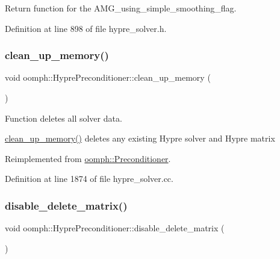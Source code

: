 Return function for the A\+M\+G\+\_\+using\+\_\+simple\+\_\+smoothing\+\_\+flag. 



Definition at line 898 of file hypre\+\_\+solver.\+h.

\mbox{\label{classoomph_1_1HyprePreconditioner_a4d2ffc88b3a9e9ba84f969211b433231}} 
\subsubsection{\texorpdfstring{clean\+\_\+up\+\_\+memory()}{clean\_up\_memory()}}
{\footnotesize\ttfamily void oomph\+::\+Hypre\+Preconditioner\+::clean\+\_\+up\+\_\+memory (\begin{DoxyParamCaption}{ }\end{DoxyParamCaption})\hspace{0.3cm}{\ttfamily [virtual]}}



Function deletes all solver data. 

\hyperlink{classoomph_1_1HyprePreconditioner_a4d2ffc88b3a9e9ba84f969211b433231}{clean\+\_\+up\+\_\+memory()} deletes any existing Hypre solver and Hypre matrix 

Reimplemented from \hyperlink{classoomph_1_1Preconditioner_a46c31c416829bedcd9db238431262027}{oomph\+::\+Preconditioner}.



Definition at line 1874 of file hypre\+\_\+solver.\+cc.

\mbox{\label{classoomph_1_1HyprePreconditioner_a53c33cbd53d80d45ba2326273033f036}} 
\subsubsection{\texorpdfstring{disable\+\_\+delete\+\_\+matrix()}{disable\_delete\_matrix()}}
{\footnotesize\ttfamily void oomph\+::\+Hypre\+Preconditioner\+::disable\+\_\+delete\+\_\+matrix (\begin{DoxyParamCaption}{ }\end{DoxyParamCaption})\hspace{0.3cm}{\ttfamily [inline]}}



